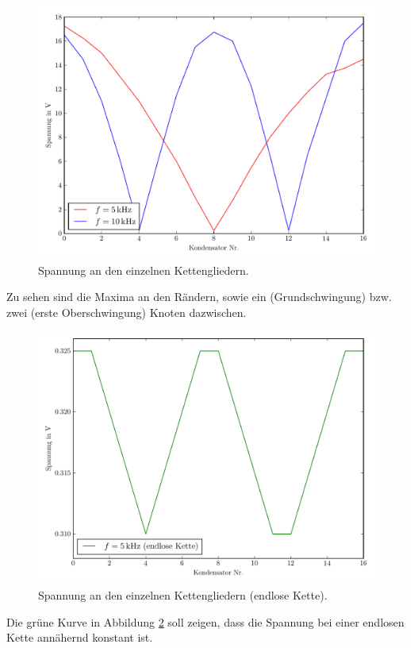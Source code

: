 \documentclass[
  bibliography=totoc,     %
  captions=tableheading,  %
  titlepage=firstiscover, %
]{scrartcl}
\begin{document}
\clearpage
\begin{figure}
  \centering
  \includegraphics[width=\textwidth]{Plot5.pdf}
  \caption{Spannung an den einzelnen Kettengliedern.}
  \label{fig:plot4}
\end{figure}
Zu sehen sind die Maxima an den Rändern, sowie ein (Grundschwingung) bzw. zwei (erste Oberschwingung)
Knoten dazwischen.
\clearpage
\begin{figure}
  \centering
  \includegraphics[width=\textwidth]{Plot7.pdf}
  \caption{Spannung an den einzelnen Kettengliedern (endlose Kette).}
  \label{fig:plot5}
\end{figure}
Die grüne Kurve in Abbildung \ref{fig:plot5} soll zeigen, dass die Spannung bei
einer endlosen Kette annähernd konstant ist.
\clearpage
\end{document}
